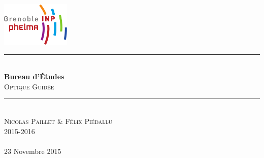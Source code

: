 \begin{titlepage}
    \vspace*{-10px}
    \includegraphics[height=80px]{logo_phelma.pdf}
    \vspace*{-80px}
\begin{flushright}
    \vspace*{60px}
\end{flushright}

\vspace*{0.5cm}
\begin{center}
\rule{\linewidth}{0.5mm}\\[0.4cm]
{\huge{\bfseries Bureau d'Études}\\[0.4cm]
\textsc{Optique Guidée}\\[0.4cm]}
\rule{\linewidth}{0.5mm}\\[0.5cm]

\LARGE{\textsc{Nicolas Paillet \& Félix Piédallu}}\\[0.7cm]
\large{\textsc{2015-2016}}\\[2cm]

\Large{~}\\[1cm]

\large{23 Novembre 2015}\\[2cm]


\end{center}
\end{titlepage}

\tableofcontents        %
\newpage
{}  %
